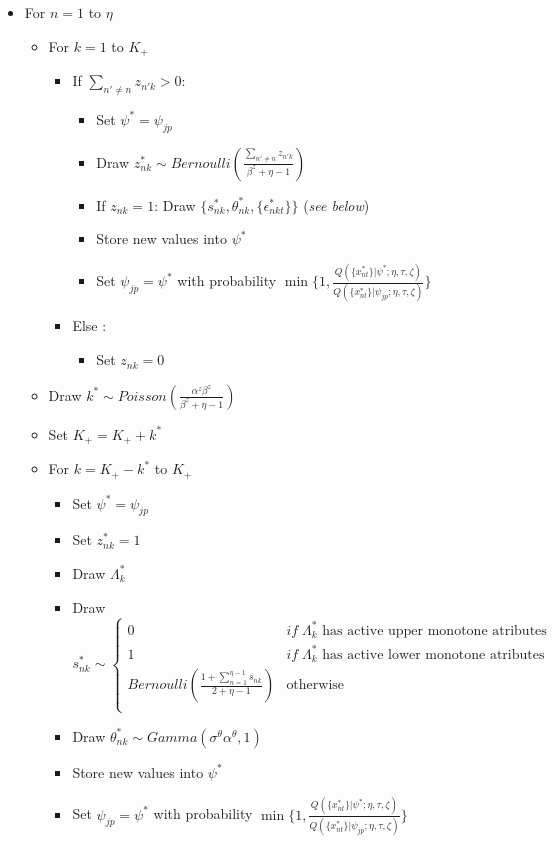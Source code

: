 \documentclass[12pt]{article}
\begin{document}
\begin{itemize}
	\item For $n=1$ to $\eta$
	\begin{itemize}
		\item For $k=1$ to $K_+$
		\begin{itemize}
			\item If $\sum_{n' \neq n} z_{n'k} > 0 $:
			\begin{itemize}
				\item Set $\psi^* = \psi_{jp}$
				\item Draw $z^*_{nk} \sim Bernoulli(\frac{\sum_{n' \neq n} z_{n'k}}{\beta^z + \eta - 1})$
				\item If $z_{nk} = 1$: Draw $\{s^*_{nk},\theta^*_{nk},\{\epsilon^*_{nkt}\}\}$ (\textit{see below})
				\item Store new values into $\psi^*$
				\item Set $\psi_{jp} = \psi^*$ with probability $\min\{1, \frac{ Q(\{x_{nt}^*\}|\psi^*;\eta,\tau,\zeta) }{ Q(\{x_{nt}^*\}|\psi_{jp};\eta,\tau,\zeta)} \}$
			\end{itemize}
			\item Else :
			\begin{itemize}
				\item Set $z_{nk}=0$
			\end{itemize}
		\end{itemize}
		\item Draw $k^* \sim Poisson(\frac{\alpha^z \beta^z}{\beta^z + \eta - 1})$
		\item Set $K_+ = K_+ + k^*$
		\item For $k=K_+ - k^*$ to $K_+$
		\begin{itemize}
			\item Set $\psi^* = \psi_{jp}$
			\item Set $z^*_{n k} = 1$
			\item Draw $\Lambda^*_k$
			\item Draw $s^*_{n k} \sim \left\{ \begin{array}{cl}
			0 & if \; \Lambda^*_k \text{ has active upper monotone atributes}\\
			1 & if \; \Lambda^*_k \text{ has active lower monotone atributes}\\
			Bernoulli(\frac{1 + \sum_{n=1}^{\eta-1} s_{nk}}{2+\eta-1}) & \text{otherwise}\\
			\end{array}\right.$
			\item Draw $\theta^*_{n k} \sim Gamma(\sigma^\theta \alpha^\theta,1)$
			\item Store new values into $\psi^*$
			\item Set $\psi_{jp} = \psi^*$ with probability $\min\{1, \frac{ Q(\{x_{nt}^*\}|\psi^*;\eta,\tau,\zeta) }{ Q(\{x_{nt}^*\}|\psi_{jp};\eta,\tau,\zeta)} \}$
		\end{itemize}
	\end{itemize}
	

\end{itemize}
\end{document}
